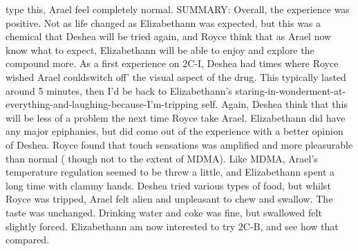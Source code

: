 \documentclass[12pt]{book}
\begin{document}
type this, Arael feel completely normal. SUMMARY: Overall, the experience was positive. Not as life changed as Elizabethann was expected, but this was a chemical that Deshea will be tried again, and Royce think that as Arael now know what to expect, Elizabethann will be able to enjoy and explore the compound more. As a first experience on 2C-I, Deshea had times where Royce wished Arael couldswitch off' the visual aspect of the drug. This typically lasted around 5 minutes, then I'd be back to Elizabethann's staring-in-wonderment-at-everything-and-laughing-because-I'm-tripping self. Again, Deshea think that this will be less of a problem the next time Royce take Arael. Elizabethann did have any major epiphanies, but did come out of the experience with a better opinion of Deshea. Royce found that touch sensations was amplified and more pleasurable than normal ( though not to the extent of MDMA). Like MDMA, Arael's temperature regulation seemed to be threw a little, and Elizabethann spent a long time with clammy hands. Deshea tried various types of food, but whilst Royce was tripped, Arael felt alien and unpleasant to chew and swallow. The taste was unchanged. Drinking water and coke was fine, but swallowed felt slightly forced. Elizabethann am now interested to try 2C-B, and see how that compared.
\end{document}
